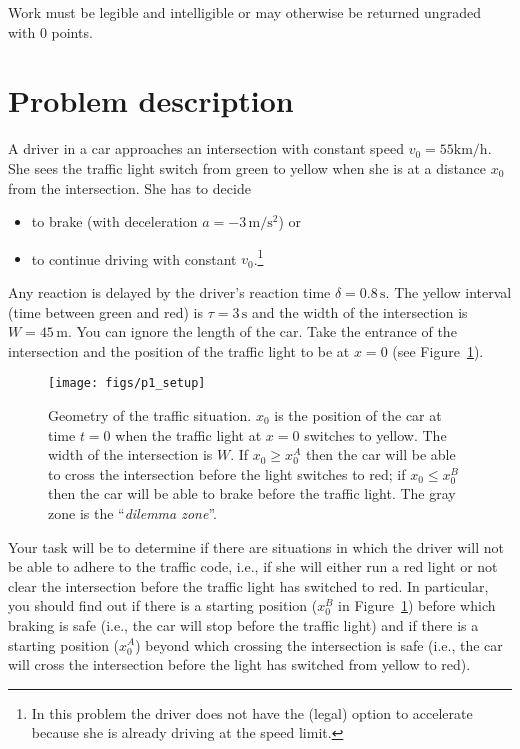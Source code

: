 \documentclass[letterpaper]{scrartcl}
\begin{document}
Work must be legible and intelligible or may otherwise be
returned ungraded with 0 points.

\section{Problem description}
\label{sec:problem}

A driver in a car approaches an intersection with constant speed
$v_0 = 55 \text{km/h}$. She sees the traffic light switch from green
to yellow when she is at a distance $x_0$ from the intersection. She
has to decide
\begin{itemize}
\item to brake (with deceleration $a = -3\,\text{m/s$^{2}$}$) or
\item to continue driving with constant $v_0$.\footnote{In this
    problem the driver does not have the (legal) option to accelerate
    because she is already driving at the speed limit.}
\end{itemize}
Any reaction is delayed by the driver's reaction time
$\delta = 0.8\,\text{s}$. The yellow interval (time between green and
red) is $\tau = 3\,\text{s}$ and the width of the intersection is
$W = 45\,\text{m}$. You can ignore the length of the car. Take the
entrance of the intersection and the position of the traffic light to
be at $x=0$ (see Figure~\ref{fig:setup}).

\begin{figure}[btp]
  \centering
  \texttt{[image: figs/p1\_setup]}
  \caption{Geometry of the traffic situation. $x_{0}$ is the position
    of the car at time $t=0$ when the traffic light at $x=0$ switches
    to yellow. The width of the intersection is $W$. If $x_{0} \ge
    x_{0}^{A}$ then the car will be able to cross the intersection
    before the light switches to red; if $x_{0} \le x_{0}^{B}$ then
    the car will be able to brake before the traffic light. The gray
    zone is the ``\emph{dilemma zone}''.}
  \label{fig:setup}
\end{figure}

Your task will be to determine if there are situations in which the
driver will not be able to adhere to the traffic code, i.e., if she
will either run a red light or not clear the intersection before the
traffic light has switched to red. In particular, you should find out
if there is a starting position ($x_{0}^{B}$ in
Figure~\ref{fig:setup}) before which braking is safe (i.e., the car
will stop before the traffic light) and if there is a starting
position ($x_{0}^{A}$) beyond which crossing the intersection is safe
(i.e., the car will cross the intersection before the light has
switched from yellow to red).
\end{document}
